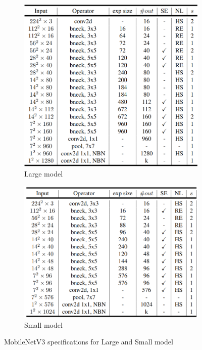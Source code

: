 \documentclass[12pt, letterpaper, twoside]{article}
\begin{document}
\begin{figure}[h]
	\centering
	\begin{subfigure}{.5\textwidth}
		\centering
		\includegraphics[width=.9\linewidth]{spec_large.png}
		\caption{Large model}
	\end{subfigure}%
	\begin{subfigure}{.5\textwidth}
		\centering
		\includegraphics[width=.9\linewidth]{spec_small.png}
		\caption{Small model}
	\end{subfigure}
	\caption{MobileNetV3 specifications for Large and Small model}
	\label{fig:specifications}
\end{figure}
\end{document}
